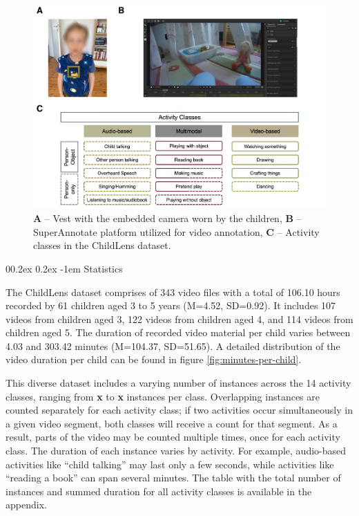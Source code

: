 \documentclass[
  man,floatsintext]{apa6}
\makeatletter
\let\oldparagraph\paragraph
\renewcommand{\paragraph}{
    \@ifstar
      \xxxParagraphStar
      \xxxParagraphNoStar
  }
\newcommand{\xxxParagraphStar}[1]{\oldparagraph*{#1}\mbox{}}
\newcommand{\xxxParagraphNoStar}[1]{\oldparagraph{#1}\mbox{}}
\renewcommand{\paragraph}{\@startsection{paragraph}{4}{\parindent}%
  {0\baselineskip \@plus 0.2ex \@minus 0.2ex}%
  {-1em}%
  {\normalfont\normalsize\bfseries\itshape\typesectitle}}
\makeatother
\begin{document}
\begin{figure}

{\centering \includegraphics{ChildLens_paper_files/figure-latex/camera-superannotate-activity-classes-1} 

}

\caption{\textbf{A} – Vest with the embedded camera worn by the children, \textbf{B} – SuperAnnotate platform utilized for video annotation, \textbf{C} – Activity classes in the ChildLens dataset.}\label{fig:camera-superannotate-activity-classes}
\end{figure}

\paragraph{Statistics}\label{statistics}

The ChildLens dataset comprises of 343 video files with a total of 106.10 hours recorded by 61 children aged 3 to 5 years (M=4.52, SD=0.92). It includes 107 videos from children aged 3, 122 videos from children aged 4, and 114 videos from children aged 5. The duration of recorded video material per child varies between 4.03 and 303.42 minutes (M=104.37, SD=51.65). A detailed distribution of the video duration per child can be found in figure \ref{fig:minutes-per-child}.

This diverse dataset includes a varying number of instances across the 14 activity classes, ranging from \textbf{x} to \textbf{x} instances per class. Overlapping instances are counted separately for each activity class; if two activities occur simultaneously in a given video segment, both classes will receive a count for that segment. As a result, parts of the video may be counted multiple times, once for each activity class. The duration of each instance varies by activity. For example, audio-based activities like ``child talking'' may last only a few seconds, while activities like ``reading a book'' can span several minutes. The table with the total number of instances and summed duration for all activity classes is available in the appendix.
\end{document}
